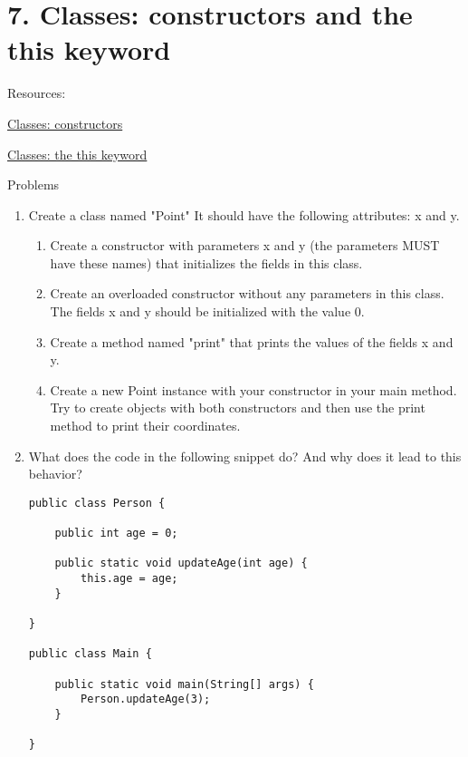 \documentclass[12pt,letterpaper]{article}
\newcommand\hwnumber{7}
\begin{document}
\section*{\hwnumber. Classes: constructors and the this keyword}
Resources:
\begin{description}
    \item \href{https://www.w3schools.com/java/java_constructors.asp}{Classes: constructors}
    \item \href{https://www.baeldung.com/java-this}{Classes: the this keyword}
\end{description}


Problems
\begin{enumerate}
\item
Create a class named "Point" It should have the following attributes: x and y.
\begin{enumerate}
\item
Create a constructor with parameters x and y (the parameters MUST have these names) that initializes the fields in this class.

\item
Create an overloaded constructor without any parameters in this class.
The fields x and y should be initialized with the value 0.

\item
Create a method named "print" that prints the values of the fields x and y.

\item
Create a new Point instance with your constructor in your main method. Try to create objects with both
constructors and then use the print method to print their coordinates.

\end{enumerate}

\item
What does the code in the following snippet do? And why does it lead to this behavior?
\begin{lstlisting}
public class Person {

    public int age = 0;

    public static void updateAge(int age) {
        this.age = age;
    }

}

public class Main {

    public static void main(String[] args) {
        Person.updateAge(3);
    }

}
\end{lstlisting}


\end{enumerate}
\end{document}
